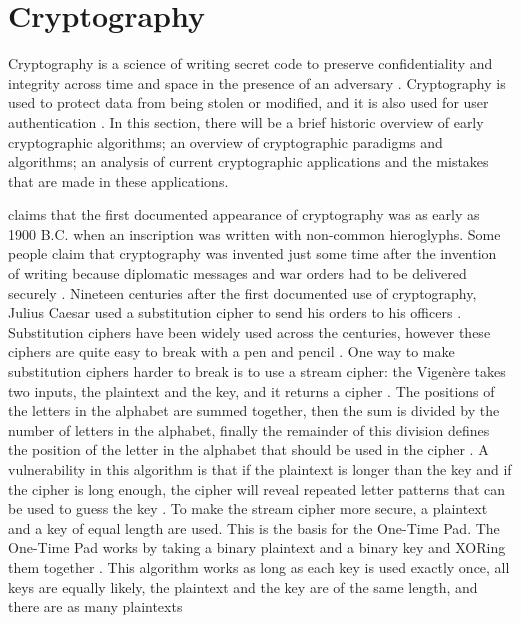 \documentclass{l4proj}
\begin{document}
\section{Cryptography}

Cryptography is a science of writing secret code to preserve confidentiality and integrity across time and space in the presence of an adversary \citep{kessler_overview_2016} 
\citep{savage_cse_2019}. Cryptography is used to protect data from being stolen or modified, and it is also used for user authentication \citep{kessler_overview_2016}. 
In this section, there will be a brief historic overview of early cryptographic algorithms; an overview of cryptographic paradigms and algorithms; 
an analysis of current cryptographic applications and the mistakes that are made in these applications.

\citet{kessler_overview_2016} claims that the first documented appearance of cryptography was as early as 1900 B.C. when an inscription was written with non-common hieroglyphs.
Some people claim that cryptography was invented just some time after the invention of writing because diplomatic messages and war orders had to be delivered securely 
\citep{kessler_overview_2016}. Nineteen centuries after the first documented use of cryptography, Julius Caesar used a substitution cipher to send his orders to his officers 
\citep{anderson_security_2008}. Substitution ciphers have been widely used across the centuries, however these ciphers are quite easy to break with a pen and pencil 
\citep{anderson_security_2008}. One way to make substitution ciphers harder to break is to use a stream cipher: the Vigenère takes two inputs, the plaintext and the key, and it
returns a cipher \citep{anderson_security_2008}. The positions of the letters in the alphabet are summed together, then the sum is divided by the number of letters in the alphabet, 
finally the remainder of this division defines the position of the letter in the alphabet that should be used in the cipher \citep{anderson_security_2008}. 
A vulnerability in this algorithm is that if the plaintext is longer than the key and if the cipher is long enough, the cipher will reveal repeated letter patterns 
that can be used to guess the key \citep{anderson_security_2008}. To make the stream cipher more secure, a plaintext and a key of equal length are used. 
This is the basis for the One-Time Pad. The One-Time Pad works by taking a binary plaintext and a binary key and XORing them together \citep{savage_cse_2019}.
This algorithm works as long as each key is used exactly once, all keys are equally likely, the plaintext and the key are of the same length, and there are as many plaintexts 
\end{document}
